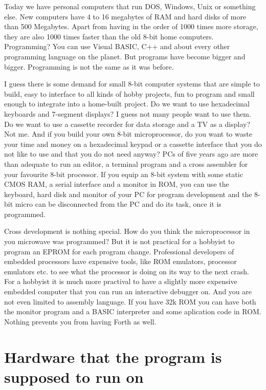 Today we have personal computers that run DOS, Windows, Unix or something
else. New computers have 4 to 16 megabytes of RAM and hard disks of more
than 500 Megabytes. Apart from having in the order of 1000 times more
storage, they are also 1000 times faster than the old 8-bit home computers. 
Programming? You can use Visual BASIC, C++ and about
every other programming language on the planet. But programs have become
bigger and bigger. Programming is not the same as it was before. 

I guess there is some demand for small 8-bit computer systems that are simple
to build, easy to interface to all kinds of hobby projects, fun to program
and small enough to integrate into a home-built project.
Do we want to use hexadecimal keyboards and 7-segment displays? I guess not
many people want to use them. Do we want to use a cassette recorder for data
storage and a TV as a display? Not me. And if you build your own 8-bit
microprocessor, do you want to waste your time and money on a hexadecimal
keypad or a cassette interface that you do not like to use and that you do
not need anyway? PCs of five years ago are more than adequate to run an
editor, a terminal program and a cross assembler for your favourite 8-bit
processor. If you equip an 8-bit system with some static CMOS RAM, a serial
interface and a monitor in ROM, you can use the keyboard, hard disk and
monitor of your PC for program development and the 8-bit micro can be
disconnected from the PC and do its task, once it is programmed.

Cross development is nothing special. How do you think the microprocessor in
you microwave was programmed? But it is not practical for a hobbyist to
program an EPROM for each program change. Professional developers of
embedded processors have expensive tools, like ROM emulators, processor
emulators etc. to see what the processor is doing on its way to the next
crash. For a hobbyist it is much more practival to have a slightly more
expensive embedded computer that you can run an interactive debugger on.
And you are not even limited to assembly language. If you have 32k ROM you
can have both the monitor program and a BASIC interpreter and some
aplication code in ROM. Nothing prevents you from having Forth as well.


\chapter{Hardware that the program is supposed to run on}

